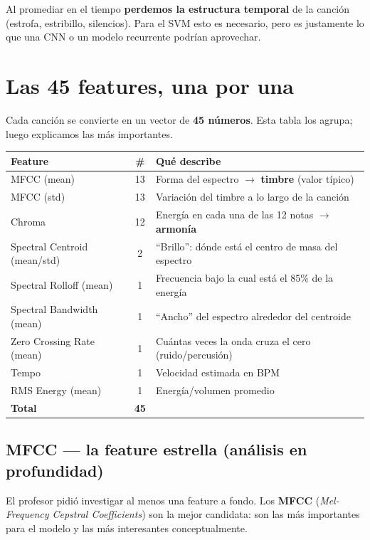 \documentclass[11pt,a4paper]{article}
\newenvironment{defenbox}[1]{\begin{mdframed}[style=defenstyle,frametitle={#1}]}{\end{mdframed}}
\begin{document}
\begin{defenbox}{Limitación a mencionar en la defensa}
Al promediar en el tiempo \textbf{perdemos la estructura temporal} de la canción
(estrofa, estribillo, silencios). Para el SVM esto es necesario, pero es
justamente lo que una CNN o un modelo recurrente podrían aprovechar.
\end{defenbox}

\section{Las 45 features, una por una}

Cada canción se convierte en un vector de \textbf{45 números}. Esta tabla los
agrupa; luego explicamos las más importantes.

\begin{longtable}{p{3.6cm} c p{7.5cm}}
\toprule
\textbf{Feature} & \textbf{\#} & \textbf{Qué describe} \\
\midrule
MFCC (mean) & 13 & Forma del espectro $\rightarrow$ \textbf{timbre} (valor típico) \\
MFCC (std) & 13 & Variación del timbre a lo largo de la canción \\
Chroma & 12 & Energía en cada una de las 12 notas $\rightarrow$ \textbf{armonía} \\
Spectral Centroid (mean/std) & 2 & ``Brillo'': dónde está el centro de masa del espectro \\
Spectral Rolloff (mean) & 1 & Frecuencia bajo la cual está el 85\% de la energía \\
Spectral Bandwidth (mean) & 1 & ``Ancho'' del espectro alrededor del centroide \\
Zero Crossing Rate (mean) & 1 & Cuántas veces la onda cruza el cero (ruido/percusión) \\
Tempo & 1 & Velocidad estimada en BPM \\
RMS Energy (mean) & 1 & Energía/volumen promedio \\
\midrule
\textbf{Total} & \textbf{45} & \\
\bottomrule
\end{longtable}

\subsection{MFCC --- la feature estrella (análisis en profundidad)}

El profesor pidió investigar al menos una feature a fondo. Los \textbf{MFCC}
(\emph{Mel-Frequency Cepstral Coefficients}) son la mejor candidata: son las más
importantes para el modelo y las más interesantes conceptualmente.
\end{document}
